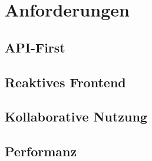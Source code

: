 \section{Anforderungen}
\label{sec:e-anforderungen}

\subsection{API-First}
\label{ssec:epa-api-first}

\subsection{Reaktives Frontend}
\label{ssec:epa-reaktives-frontend}

\subsection{Kollaborative Nutzung}
\label{ssec:epa-kollaborative_nutzung}

\subsection{Performanz}
\label{ssec:epa-performanz}
